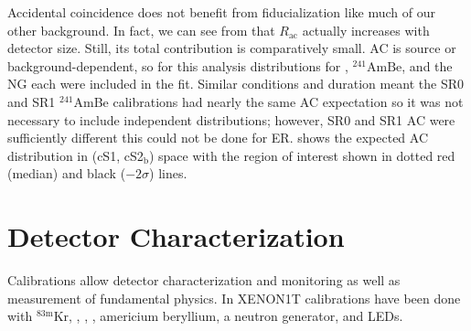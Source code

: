 Accidental coincidence does not benefit from fiducialization like much of our other background.  In fact, we can see from
 that $R_{\mathrm{ac}}$ actually increases
with detector size.  Still, its total contribution is comparatively small.  AC is source or background-dependent, so for this analysis
distributions for , $\mathrm{^{241}AmBe}$, and the NG each were included in the
fit.  Similar conditions and duration meant the SR0 and SR1 $^{241}$AmBe calibrations had nearly the same AC expectation so it was not
necessary to include independent distributions; however, SR0 and SR1 AC  were sufficiently different this could not be
done for ER.   shows the expected AC distribution in (cS1, cS2$_{\mathrm{b}}$) space
with the region of interest shown in dotted red (median) and black ($-2 \sigma$) lines.



\section{Detector Characterization}
\label{sec:det_char}
Calibrations allow detector characterization and monitoring as well as measurement of fundamental physics.  In XENON1T calibrations have
been done with $\mathrm{^{83m}Kr}$, , , , americium beryllium, a neutron generator, and LEDs.


